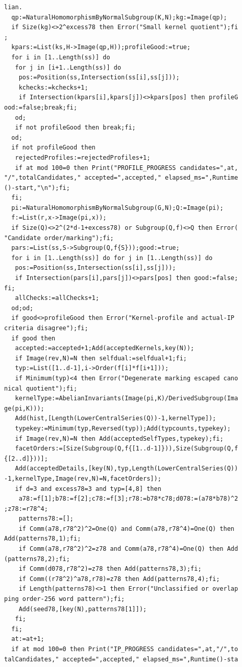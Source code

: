\documentclass[
  11pt,
  a4paper,
]{article}
\begin{document}
\begin{verbatim}
lian.
  qp:=NaturalHomomorphismByNormalSubgroup(K,N);kg:=Image(qp);
  if Size(kg)<>2^excess78 then Error("Small kernel quotient");fi
;
  kpars:=List(ks,H->Image(qp,H));profileGood:=true;
  for i in [1..Length(ss)] do
   for j in [i+1..Length(ss)] do
    pos:=Position(ss,Intersection(ss[i],ss[j]));
    kchecks:=kchecks+1;
    if Intersection(kpars[i],kpars[j])<>kpars[pos] then profileG
ood:=false;break;fi;
   od;
   if not profileGood then break;fi;
  od;
  if not profileGood then
   rejectedProfiles:=rejectedProfiles+1;
   if at mod 100=0 then Print("PROFILE_PROGRESS candidates=",at,
"/",totalCandidates," accepted=",accepted," elapsed_ms=",Runtime
()-start,"\n");fi;
  fi;
  pi:=NaturalHomomorphismByNormalSubgroup(G,N);Q:=Image(pi);
  f:=List(r,x->Image(pi,x));
  if Size(Q)<>2^(2*d-1+excess78) or Subgroup(Q,f)<>Q then Error(
"Candidate order/marking");fi;
  pars:=List(ss,S->Subgroup(Q,f{S}));good:=true;
  for i in [1..Length(ss)] do for j in [1..Length(ss)] do
   pos:=Position(ss,Intersection(ss[i],ss[j]));
   if Intersection(pars[i],pars[j])<>pars[pos] then good:=false;
fi;
   allChecks:=allChecks+1;
  od;od;
  if good<>profileGood then Error("Kernel-profile and actual-IP 
criteria disagree");fi;
  if good then
   accepted:=accepted+1;Add(acceptedKernels,key(N));
   if Image(rev,N)=N then selfdual:=selfdual+1;fi;
   typ:=List([1..d-1],i->Order(f[i]*f[i+1]));
   if Minimum(typ)<4 then Error("Degenerate marking escaped cano
nical quotient");fi;
   kernelType:=AbelianInvariants(Image(pi,K)/DerivedSubgroup(Ima
ge(pi,K)));
   Add(hist,[Length(LowerCentralSeries(Q))-1,kernelType]);
   typekey:=Minimum(typ,Reversed(typ));Add(typcounts,typekey);
   if Image(rev,N)=N then Add(acceptedSelfTypes,typekey);fi;
   facetOrders:=[Size(Subgroup(Q,f{[1..d-1]})),Size(Subgroup(Q,f
{[2..d]}))];
   Add(acceptedDetails,[key(N),typ,Length(LowerCentralSeries(Q))
-1,kernelType,Image(rev,N)=N,facetOrders]);
   if d=3 and excess78=3 and typ=[4,8] then
    a78:=f[1];b78:=f[2];c78:=f[3];r78:=b78*c78;d078:=(a78*b78)^2
;z78:=r78^4;
    patterns78:=[];
    if Comm(a78,r78^2)^2=One(Q) and Comm(a78,r78^4)=One(Q) then 
Add(patterns78,1);fi;
    if Comm(a78,r78^2)^2=z78 and Comm(a78,r78^4)=One(Q) then Add
(patterns78,2);fi;
    if Comm(d078,r78^2)=z78 then Add(patterns78,3);fi;
    if Comm((r78^2)^a78,r78)=z78 then Add(patterns78,4);fi;
    if Length(patterns78)<>1 then Error("Unclassified or overlap
ping order-256 word pattern");fi;
    Add(seed78,[key(N),patterns78[1]]);
   fi;
  fi;
  at:=at+1;
  if at mod 100=0 then Print("IP_PROGRESS candidates=",at,"/",to
talCandidates," accepted=",accepted," elapsed_ms=",Runtime()-sta

\end{verbatim}
\end{document}
